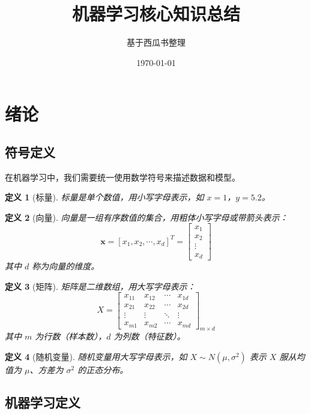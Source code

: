 \documentclass[12pt,a4paper]{ctexart}
\title{\textbf{机器学习核心知识总结}}
\author{基于西瓜书整理}
\date{\today}
\newtheorem{definition}{定义}[section]
\begin{document}
\maketitle
\tableofcontents
\newpage

\section{绪论}

\subsection{符号定义}

在机器学习中，我们需要统一使用数学符号来描述数据和模型。

\begin{definition}[标量]
标量是单个数值，用小写字母表示，如 $x = 1$，$y = 5.2$。
\end{definition}

\begin{definition}[向量]
向量是一组有序数值的集合，用粗体小写字母或带箭头表示：
\[
\mathbf{x} = [x_1, x_2, \cdots, x_d]^T = \begin{bmatrix} x_1 \\ x_2 \\ \vdots \\ x_d \end{bmatrix}
\]
其中 $d$ 称为向量的维度。
\end{definition}

\begin{definition}[矩阵]
矩阵是二维数组，用大写字母表示：
\[
X = \begin{bmatrix}
x_{11} & x_{12} & \cdots & x_{1d} \\
x_{21} & x_{22} & \cdots & x_{2d} \\
\vdots & \vdots & \ddots & \vdots \\
x_{m1} & x_{m2} & \cdots & x_{md}
\end{bmatrix}_{m \times d}
\]
其中 $m$ 为行数（样本数），$d$ 为列数（特征数）。
\end{definition}

\begin{definition}[随机变量]
随机变量用大写字母表示，如 $X \sim N(\mu, \sigma^2)$ 表示 $X$ 服从均值为 $\mu$、方差为 $\sigma^2$ 的正态分布。
\end{definition}

\subsection{机器学习定义}
\end{document}
